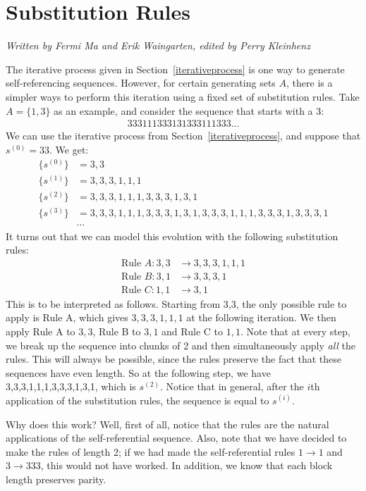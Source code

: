 \documentclass[runningheads,a4paper]{llncs}
\begin{document}
\section{Substitution Rules}
\label{substitutionrules}

\emph{Written by Fermi Ma and Erik Waingarten, edited by Perry Kleinhenz}

The iterative process given in Section~\ref{iterativeprocess} is one way to generate self-referencing sequences. However, for certain generating sets $A$, there is a simpler ways to perform this iteration using a fixed set of substitution rules. Take $A = \{1,3\}$ as an example, and consider the sequence that starts with a 3:
\begin{align*}
333111333131333111333\dots
\end{align*}
We can use the iterative process from Section~\ref{iterativeprocess}, and suppose that $s^{(0)} = 33$. We get:
\begin{align*}
\{s^{(0)}\} &= 3,3\\
\{s^{(1)}\} &= 3,3,3,1,1,1\\
\{s^{(2)}\} &= 3,3,3,1,1,1,3,3,3,1,3,1\\
\{s^{(3)}\} &= 3,3,3,1,1,1,3,3,3,1,3,1,3,3,3,1,1,1,3,3,3,1,3,3,3,1\\
&\cdots
\end{align*}
It turns out that we can model this evolution with the following substitution rules:
\begin{align*}
\text{Rule }A: 3,3 &\to 3,3,3,1,1,1 \\
\text{Rule }B: 3,1 &\to 3,3,3,1\\
\text{Rule }C: 1,1 &\to 3,1
\end{align*}
This is to be interpreted as follows. Starting from 3,3, the only possible rule to apply is Rule A, which gives $3,3,3,1,1,1$ at the following iteration. We then apply Rule A to $3,3$, Rule B to $3,1$ and Rule C to $1,1$. Note that at every step, we break up the sequence into chunks of 2 and then simultaneously apply \emph{all} the rules. This will always be possible, since the rules preserve the fact that these sequences have even length. So at the following step, we have 3,3,3,1,1,1,3,3,3,1,3,1, which is $s^{(2)}$. Notice that in general, after the $i$th application of the substitution rules, the sequence is equal to $s^{(i)}$.

Why does this work? Well, first of all, notice that the rules are the natural applications of the self-referential sequence. Also, note that we have decided to make the rules of length 2; if we had made the self-referential rules $1 \rightarrow 1$ and $3 \rightarrow 333$, this would not have worked. In addition, we know that each block length preserves parity. 
\end{document}
